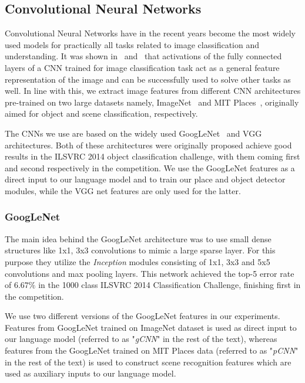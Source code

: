 \subsection{Convolutional Neural Networks}
Convolutional Neural Networks have in the recent years become the most widely
used models for practically all tasks related to image classification and
understanding.
It was shown in~\cite{Donahue2014} and~\cite{Razavian2014CVPR} that activations
of the fully connected layers of a CNN trained for image classification task act
as a general feature representation of the image and can be successfully used to
solve other tasks as well.
In line with this, we extract image features from different CNN architectures
pre-trained on two large datasets namely, ImageNet~\cite{ImagenetOrig} and MIT
Places~\cite{Zhou2014NIPS}, originally aimed for object and scene
classification, respectively.

The CNNs we use are based on the widely used
GoogLeNet~\cite{DBLP:journals/corr/SzegedyLJSRAEVR14} and VGG~\cite{Simonyan14c}
architectures. 
Both of these architectures were originally proposed achieve good results in the
ILSVRC 2014 object classification challenge, with them coming first and second
respectively in the competition.
We use the GoogLeNet features as a direct input to our language model and to
train our place and object detector modules, while the VGG net features are only
used for the latter.

\subsubsection{GoogLeNet} 
\label{subsec:gCNN}
The main idea behind the GoogLeNet architecture was to use small dense
structures like 1x1, 3x3 convolutions to mimic a large sparse layer.
For this purpose they utilize the \emph{Inception} modules consisting of 1x1,
3x3 and 5x5 convolutions and max pooling layers.
This network achieved the top-5 error rate of $6.67\%$ in the 1000 class ILSVRC 2014
Classification Challenge, finishing first in the competition.

We use two different versions of the GoogLeNet features in our experiments.
Features from GoogLeNet trained on ImageNet dataset is used as direct input to
our language model (referred to as "\emph{gCNN}" in the rest of the text),
whereas features from the GoogLeNet trained on MIT Places data (referred to as
"\emph{pCNN}" in the rest of the text) is used to construct scene recognition
features which are used as auxiliary inputs to our language model.

